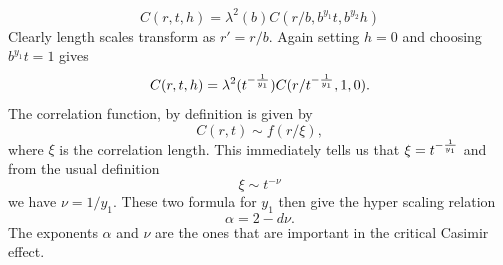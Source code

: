 \begin{equation}
C(r,t,h) = \lambda^2(b) C(r/b, b^{y_1}t, b^{y_2} h)
\end{equation}
Clearly length scales transform as $r' = r/b$. Again setting $h=0$ and choosing $b^{y_1}t=1$ gives
\begin{equation}
C(r,t,h) = \lambda^2(t^{-{1\over y_1}}) C(r/t^{-{1\over y_1}}, 1, 0).
\end{equation}
The correlation function, by definition is given by
\begin{equation}
C(r,t) \sim f(r/\xi),
\end{equation}
where $\xi$ is the correlation length. This immediately tells us that $\xi = t^{-{1\over y_1}}$ and from the usual definition 
\begin{equation}
\xi \sim t^{-\nu}
\end{equation}
we have $\nu = 1/y_1$. These two formula for $y_1$ then give the hyper scaling relation
\begin{equation}
\alpha = 2-d\nu.
\end{equation}
The exponents $\alpha$ and $\nu$ are the ones that are important in the critical Casimir effect.


